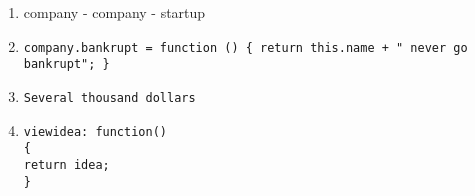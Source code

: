 \begin{enumerate}
\item company - company - startup
\item 
\begin{verbatim}
company.bankrupt = function () { return this.name + " never go bankrupt"; }
\end{verbatim}
\item 
\begin{verbatim}
Several thousand dollars
\end{verbatim}
\item 
\begin{verbatim}
viewidea: function() 
{ 
return idea; 
}
\end{verbatim}
\end{enumerate}